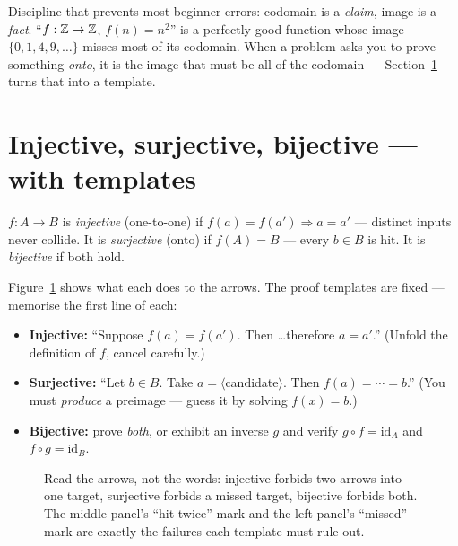 Discipline that prevents most beginner errors: codomain is a \emph{claim},
image is a \emph{fact}. ``$f : \mathbb{Z} \to \mathbb{Z}$, $f(n) = n^2$'' is a perfectly good
function whose image $\{0,1,4,9,\dots\}$ misses most of its codomain. When a
problem asks you to prove something \emph{onto}, it is the image that must be
all of the codomain --- Section~\ref{sec:injsurj} turns that into a template.

\section{Injective, surjective, bijective --- with templates}\label{sec:injsurj}

\begin{definition}
$f : A \to B$ is \emph{injective} (one-to-one) if $f(a) = f(a') \Rightarrow a = a'$
--- distinct inputs never collide. It is \emph{surjective} (onto) if
$f(A) = B$ --- every $b \in B$ is hit. It is \emph{bijective} if both hold.
\end{definition}

Figure~\ref{fig:arrows} shows what each does to the arrows. The proof
templates are fixed --- memorise the first line of each:

\begin{rulebox}
\begin{itemize}
\item \textbf{Injective:} ``Suppose $f(a) = f(a')$. Then \dots therefore
$a = a'$.'' (Unfold the definition of $f$, cancel carefully.)
\item \textbf{Surjective:} ``Let $b \in B$. Take $a = \langle$candidate$\rangle$.
Then $f(a) = \cdots = b$.'' (You must \emph{produce} a preimage --- guess it
by solving $f(x) = b$.)
\item \textbf{Bijective:} prove \emph{both}, or exhibit an inverse $g$ and
verify $g \circ f = \mathrm{id}_A$ and $f \circ g = \mathrm{id}_B$.
\end{itemize}
\end{rulebox}

\begin{figure}[ht]\centering

\caption{Read the arrows, not the words: injective forbids two arrows into
one target, surjective forbids a missed target, bijective forbids both.
The middle panel's ``hit twice'' mark and the left panel's ``missed'' mark
are exactly the failures each template must rule out.}
\label{fig:arrows}
\end{figure}

